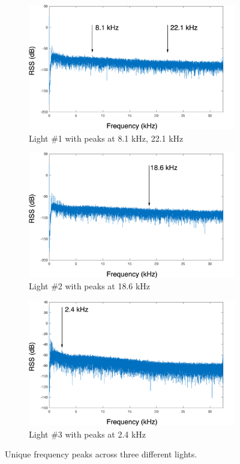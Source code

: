 \documentclass[conference]{IEEEtran}
\begin{document}
\begin{figure}[!h]
	\begin{subfigure}{.33\textwidth}
		\centering
		\includegraphics[width=1\linewidth]{figures/F/1.png}
		\caption{Light \#1 with peaks at 8.1 kHz, 22.1 kHz}
	\end{subfigure}
	\begin{subfigure}{.33\textwidth}
		\centering
		\includegraphics[width=1\linewidth]{figures/F/2.png}
		\caption{Light \#2 with peaks at 18.6 kHz}
	\end{subfigure}
	\begin{subfigure}{.33\textwidth}
		\centering
		\includegraphics[width=1\linewidth]{figures/F/3.png}
		\caption{Light \#3 with peaks at 2.4 kHz}
	\end{subfigure}
	\caption{Unique frequency peaks across three different lights.}
	\label{fig:results}
\end{figure}
\end{document}

